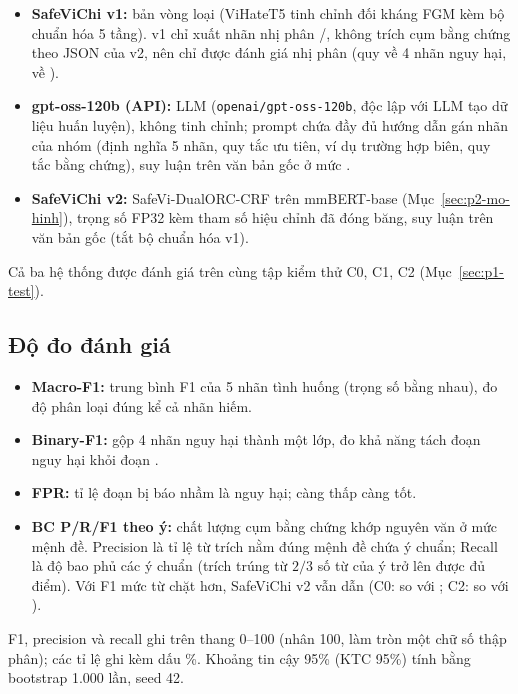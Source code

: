 \begin{itemize}
  \item \textbf{SafeViChi v1:} bản vòng loại (ViHateT5 tinh chỉnh đối kháng FGM kèm bộ chuẩn hóa 5 tầng). v1 chỉ xuất
        nhãn nhị phân /, không trích cụm bằng chứng theo JSON của v2, nên chỉ được đánh giá nhị
        phân (quy  về 4 nhãn nguy hại,  về ).
  \item \textbf{gpt-oss-120b (API):} LLM (\texttt{openai/gpt-oss-120b}, độc lập với LLM tạo dữ liệu huấn luyện), không
        tinh chỉnh; prompt chứa đầy đủ hướng dẫn gán nhãn của nhóm (định nghĩa 5 nhãn, quy tắc ưu tiên, ví dụ trường hợp
        biên, quy tắc bằng chứng), suy luận trên văn bản gốc ở mức \texttt{}.
  \item \textbf{SafeViChi v2:} SafeVi-DualORC-CRF trên mmBERT-base (Mục~\ref{sec:p2-mo-hinh}), trọng số FP32 kèm tham số
        hiệu chỉnh đã đóng băng, suy luận trên văn bản gốc (tắt bộ chuẩn hóa v1).
\end{itemize}

Cả ba hệ thống được đánh giá trên cùng tập kiểm thử C0, C1, C2 (Mục~\ref{sec:p1-test}).

\subsection{Độ đo đánh giá}

\begin{itemize}
  \item \textbf{Macro-F1:} trung bình F1 của 5 nhãn tình huống (trọng số bằng nhau), đo độ phân loại đúng kể cả nhãn hiếm.
  \item \textbf{Binary-F1:} gộp 4 nhãn nguy hại thành một lớp, đo khả năng tách đoạn nguy hại khỏi đoạn .
  \item \textbf{FPR:} tỉ lệ đoạn  bị báo nhầm là nguy hại; càng thấp càng tốt.
  \item \textbf{BC P/R/F1 theo ý:} chất lượng cụm bằng chứng khớp nguyên văn ở mức mệnh đề. Precision là tỉ lệ từ trích
        nằm đúng mệnh đề chứa ý chuẩn; Recall là độ bao phủ các ý chuẩn (trích trúng từ $2/3$ số từ của ý trở lên được
        đủ điểm). Với F1 mức từ chặt hơn, SafeViChi v2 vẫn dẫn (C0:  so với ; C2:
         so với ).
\end{itemize}

F1, precision và recall ghi trên thang 0--100 (nhân 100, làm tròn một chữ số thập phân); các tỉ lệ ghi kèm dấu \%.
Khoảng tin cậy 95\% (KTC 95\%) tính bằng bootstrap 1.000 lần, seed 42.

